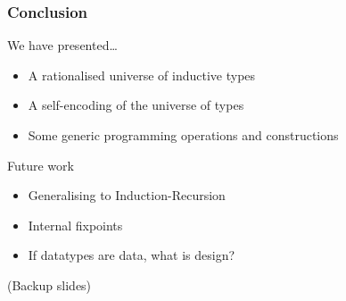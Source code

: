 \documentclass{beamer}
\begin{document}
\begin{frame}

\frametitle{Conclusion}

\begin{block}{We have presented\ldots}
\begin{itemize}
\item A rationalised universe of inductive types
\item A self-encoding of the universe of types
\item Some generic programming operations and constructions
\end{itemize}
\end{block}

\begin{block}{Future work}

\begin{itemize}
\item Generalising to Induction-Recursion
\item Internal fixpoints
\item If datatypes are data, what is design?
\end{itemize}

\end{block}

\end{frame}

\begin{frame}

\begin{center}
  (Backup slides)
\end{center}

\end{frame}


\newcommand{\atag}[1]{\green{`#1`}}
\newcommand{\SYMBCUnit}{\atag{1}}
\newcommand{\SYMBCSigma}{\atag{\Sigma}}
\newcommand{\SYMBCIndx}{\atag{\CN{ind}\!\times\!}}
\newcommand{\SYMBCHindx}{\atag{\CN{hind}\!\times\!}}
\end{document}
